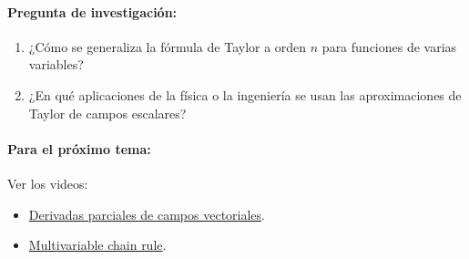 \documentclass[a4,11pt]{aleph-notas}
\begin{document}
\paragraph{Pregunta de investigación:}
\begin{enumerate}[leftmargin=*]
    \item ¿Cómo se generaliza la fórmula de Taylor a orden $n$ para funciones de varias variables?
    \item ¿En qué aplicaciones de la física o la ingeniería se usan las aproximaciones de Taylor de campos escalares?
\end{enumerate}

\paragraph{Para el próximo tema:}
Ver los videos:
\begin{itemize}[leftmargin=*]
    \item \href{https://youtu.be/5mZeT0-fzS0?si=nTnQPSBdLX6ptFpP}{Derivadas parciales de campos vectoriales}.
    \item \href{https://youtu.be/NO3AqAaAE6o?si=bZUZk__l-ebqPfhN}{Multivariable chain rule}.
\end{itemize}
\end{document}
